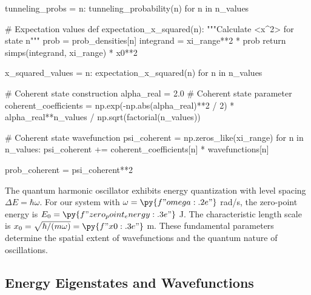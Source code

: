 \documentclass[a4paper, 11pt]{article}
\begin{document}
\begin{pycode}
tunneling_probs = {n: tunneling_probability(n) for n in n_values}

# Expectation values
def expectation_x_squared(n):
    """Calculate <x^2> for state n"""
    prob = prob_densities[n]
    integrand = xi_range**2 * prob
    return simps(integrand, xi_range) * x0**2

x_squared_values = {n: expectation_x_squared(n) for n in n_values}

# Coherent state construction
alpha_real = 2.0  # Coherent state parameter
coherent_coefficients = np.exp(-np.abs(alpha_real)**2 / 2) * alpha_real**n_values / np.sqrt(factorial(n_values))

# Coherent state wavefunction
psi_coherent = np.zeros_like(xi_range)
for n in n_values:
    psi_coherent += coherent_coefficients[n] * wavefunctions[n]

prob_coherent = psi_coherent**2
\end{pycode}

The quantum harmonic oscillator exhibits energy quantization with level spacing $\Delta E = \hbar\omega$.
For our system with $\omega = \py{f"{omega:.2e}"}$ rad/s, the zero-point energy is
$E_0 = \py{f"{zero_point_energy:.3e}"}$ J. The characteristic length scale is
$x_0 = \sqrt{\hbar/(m\omega)} = \py{f"{x0:.3e}"}$ m. These fundamental parameters determine
the spatial extent of wavefunctions and the quantum nature of oscillations.

\subsection{Energy Eigenstates and Wavefunctions}
\end{document}
